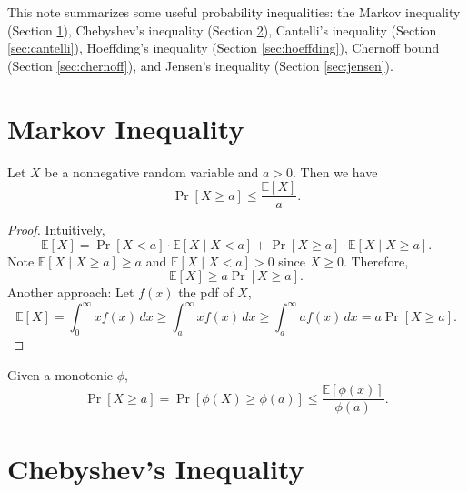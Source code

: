 






\maketitle

This note summarizes some useful probability inequalities: the Markov inequality (Section \ref{sec:markov}), Chebyshev's inequality (Section \ref{sec:chebyshev}), Cantelli's inequality (Section \ref{sec:cantelli}), Hoeffding's inequality (Section \ref{sec:hoeffding}), Chernoff bound (Section \ref{sec:chernoff}), and Jensen's inequality (Section \ref{sec:jensen}).

\section{Markov Inequality}
\label{sec:markov}

Let $X$ be a nonnegative random variable and $a>0$. Then we have
\[
	\Pr[X \geq a] \leq \frac{\mathbb{E}[X]}{a}.
\]

\begin{proof}

Intuitively,
\[
	\mathbb{E}[X] = \Pr[X<a]\cdot \mathbb{E}[X \mid X<a] + \Pr[X\geq a]\cdot \mathbb{E}[X \mid X \geq a].
\]
Note $\mathbb{E}[X \mid X \geq a] \geq a$ and $\mathbb{E}[X \mid X<a] > 0$ since $X \geq 0$. Therefore,
\[
	\mathbb{E}[X] \geq a \Pr[X \geq a].
\]
Another approach: Let $f(x)$ the pdf of $X$,
\[
	\mathbb{E}[X] = \int_0^\infty xf(x)\,dx \geq \int_a^\infty xf(x)\,dx \geq \int_a^\infty af(x)\,dx = a \Pr[X \geq a].
\]

\end{proof}

\begin{corollary}

Given a monotonic $\phi$,
\[
   \Pr[X\geq a] = \Pr[\phi(X) \geq \phi(a)] \leq \frac{\mathbb{E}[\phi(x)]}{\phi(a)}.
\]
\end{corollary}

\section{Chebyshev's Inequality}
\label{sec:chebyshev}

